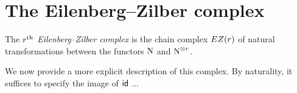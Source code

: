 \section{The Eilenberg--Zilber complex}

\begin{definition}
	The \textit{$r^\mathrm{th}$ Eilenberg--Zilber complex} is the chain complex $EZ(r)$ of natural transformations between the functors $\operatorname{N}$ and $\operatorname{N}^{\otimes r}$.
\end{definition}

We now provide a more explicit description of this complex.
By naturality, it suffices to specify the image of $\mathsf{id}$ ...